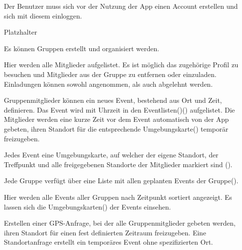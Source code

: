 \documentclass[parskip=full,11pt]{scrartcl}
\begin{document}
Der Benutzer muss sich vor der Nutzung der App einen Account erstellen und sich mit diesem einloggen.

Platzhalter %

Es können Gruppen erstellt und organisiert werden.

Hier werden alle Mitglieder aufgelistet.
Es ist möglich das zugehörige Profil zu besuchen und Mitglieder aus der Gruppe zu entfernen oder einzuladen.
Einladungen können sowohl angenommen, als auch abgelehnt werden.

Gruppenmitglieder können ein neues Event, bestehend aus Ort und Zeit, definieren.
Das Event wird mit Uhrzeit in den Eventlisten()() aufgelistet.
Die Mitglieder werden eine kurze Zeit vor dem Event automatisch von der App gebeten,
ihren Standort für die entsprechende Umgebungskarte() temporär freizugeben.

Jedes Event eine Umgebungskarte, auf welcher der eigene Standort,
der Treffpunkt und alle freigegebenen Standorte der Mitglieder markiert sind ().

Jede Gruppe verfügt über eine Liste mit allen geplanten Events der Gruppe().

Hier werden alle Events aller Gruppen nach Zeitpunkt sortiert angezeigt.
Es lassen sich die Umgebungskarten() der Events einsehen.

Erstellen einer GPS-Anfrage, bei der alle Gruppenmitglieder gebeten werden,
ihren Standort für einen fest definierten Zeitraum freizugeben.
Eine Standortanfrage erstellt ein temporäres Event ohne spezifizierten Ort.
\end{document}

